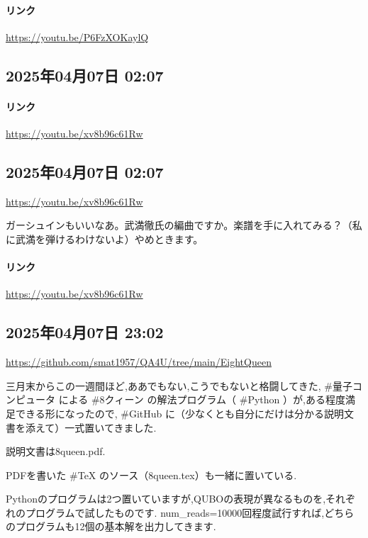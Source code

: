 \paragraph{リンク}
\url{https://youtu.be/P6FzXOKaylQ}

\subsection*{2025年04月07日 02:07}

\paragraph{リンク}
\url{https://youtu.be/xv8b96c61Rw}

\subsection*{2025年04月07日 02:07}

\url{https://youtu.be/xv8b96c61Rw}

ガーシュインもいいなあ。武満徹氏の編曲ですか。楽譜を手に入れてみる？（私に武満を弾けるわけないよ）やめときます。

\paragraph{リンク}
\url{https://youtu.be/xv8b96c61Rw}

\subsection*{2025年04月07日 23:02}

\url{https://github.com/smat1957/QA4U/tree/main/EightQueen}

三月末からこの一週間ほど,ああでもない,こうでもないと格闘してきた, \#量子コンピュータ による \#8クィーン の解法プログラム（ \#Python ）が,ある程度満足できる形になったので, \#GitHub に（少なくとも自分にだけは分かる説明文書を添えて）一式置いてきました.

説明文書は8queen.pdf.

PDFを書いた \#TeX のソース（8queen.tex）も一緒に置いている.

Pythonのプログラムは2つ置いていますが,QUBOの表現が異なるものを,それぞれのプログラムで試したものです. num\_reads=10000回程度試行すれば,どちらのプログラムも12個の基本解を出力してきます.


